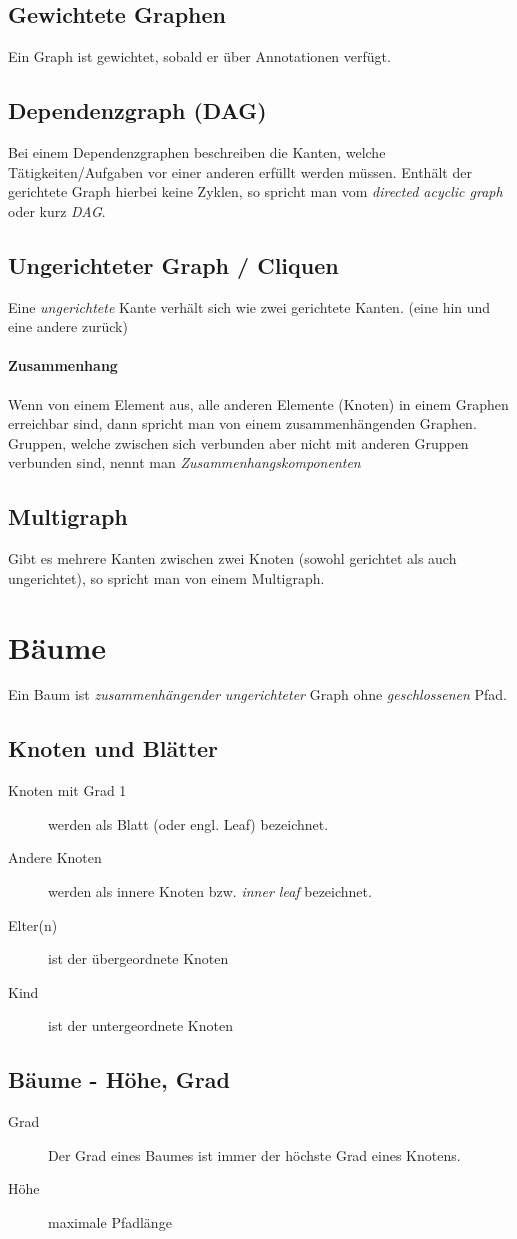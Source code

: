 \documentclass{book}
\begin{document}
\subsection{Gewichtete Graphen}
Ein Graph ist gewichtet, sobald er über Annotationen verfügt.
\subsection{Dependenzgraph (DAG)}
Bei einem Dependenzgraphen beschreiben die Kanten, welche Tätigkeiten/Aufgaben vor 
einer anderen erfüllt werden müssen.
Enthält der gerichtete Graph hierbei keine Zyklen, so spricht man vom \textit{directed acyclic graph} oder kurz \textit{DAG}.
\subsection{Ungerichteter Graph / Cliquen}
Eine \textit{ungerichtete} Kante verhält sich wie zwei gerichtete Kanten. (eine hin und eine andere zurück)

\paragraph{Zusammenhang} Wenn von einem Element aus, alle anderen Elemente (Knoten) in einem Graphen erreichbar sind,
dann spricht man von einem zusammenhängenden Graphen. Gruppen, welche zwischen sich verbunden aber nicht mit anderen Gruppen verbunden sind, nennt man \textit{Zusammenhangskomponenten}
\subsection{Multigraph} 
Gibt es mehrere Kanten zwischen zwei Knoten (sowohl gerichtet als auch ungerichtet), so spricht man von einem
Multigraph.
\section{Bäume}
Ein Baum ist \textit{zusammenhängender} \textit{ungerichteter} Graph ohne \textit{geschlossenen} Pfad.
\subsection{Knoten und Blätter}
\begin{description}
	\item[Knoten mit Grad 1]  werden als Blatt (oder engl. Leaf) bezeichnet.
	\item[Andere Knoten] werden als innere Knoten bzw. \textit{inner leaf} bezeichnet. 
	\item[Elter(n)] ist der übergeordnete Knoten
	\item[Kind] ist der untergeordnete Knoten 
\end{description}
\subsection{Bäume - Höhe, Grad}
\begin{description}
	\item[Grad] Der Grad eines Baumes ist immer der höchste Grad eines Knotens.
	\item[Höhe] maximale Pfadlänge
\end{description}
\end{document}

